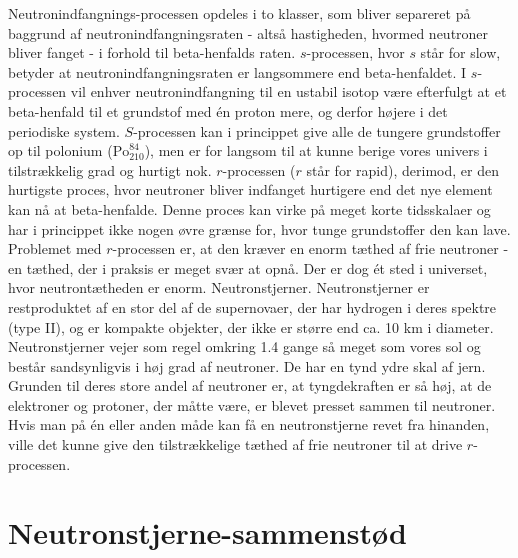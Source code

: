 \documentclass[twocolumn]{article}
\begin{document}
Neutronindfangnings-processen opdeles i to klasser, som bliver separeret på baggrund af neutronindfangningsraten - altså hastigheden, hvormed neutroner bliver fanget - i forhold til beta-henfalds raten. $s$-processen, hvor $s$ står for slow, betyder at neutronindfangningsraten er langsommere end beta-henfaldet. I $s$-processen vil enhver neutronindfangning til en ustabil isotop være efterfulgt at et beta-henfald til et grundstof med én proton mere, og derfor højere i det periodiske system. $S$-processen kan i princippet give alle de tungere grundstoffer op til polonium ($\mathrm{Po}_{210}^{84}$), men er for langsom til at kunne berige vores univers i tilstrækkelig grad og hurtigt nok. $r$-processen ($r$ står for rapid), derimod, er den hurtigste proces, hvor neutroner bliver indfanget hurtigere end det nye element kan nå at beta-henfalde. Denne proces kan virke på meget korte tidsskalaer og har i princippet ikke nogen øvre grænse for, hvor tunge grundstoffer den kan lave. Problemet med $r$-processen er, at den kræver en enorm tæthed af frie neutroner - en tæthed, der i praksis er meget svær at opnå. Der er dog ét sted i universet, hvor neutrontætheden er enorm. Neutronstjerner. Neutronstjerner er restproduktet af en stor del af de supernovaer, der har hydrogen i deres spektre (type II), og er kompakte objekter, der ikke er større end ca. 10 km i diameter. Neutronstjerner vejer som regel omkring 1.4 gange så meget som vores sol og består sandsynligvis i høj grad af neutroner. De har en tynd ydre skal af jern. Grunden til deres store andel af neutroner er, at tyngdekraften er så høj, at de elektroner og protoner, der måtte være, er blevet presset sammen til neutroner. Hvis man på én eller anden måde kan få en neutronstjerne revet fra hinanden, ville det kunne give den tilstrækkelige tæthed af frie neutroner til at drive $r$-processen.

\section{Neutronstjerne-sammenstød}\label{ns}
\end{document}
